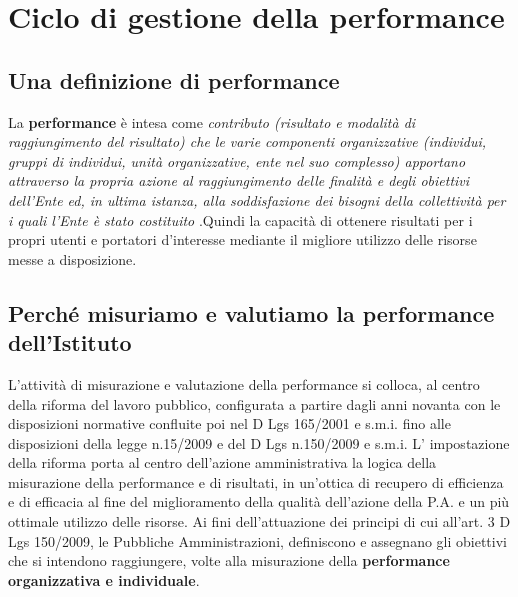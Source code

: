 \documentclass[
  12pt,
]{article}
\begin{document}
\hypertarget{ciclo-di-gestione-della-performance}{%
\section{Ciclo di gestione della
performance}\label{ciclo-di-gestione-della-performance}}

\hypertarget{una-definizione-di-performance}{%
\subsection{Una definizione di
performance}\label{una-definizione-di-performance}}

La \textbf{performance} è intesa come \emph{contributo (risultato e
modalità di raggiungimento del risultato) che le varie componenti
organizzative (individui, gruppi di individui, unità organizzative, ente
nel suo complesso) apportano attraverso la propria azione al
raggiungimento delle finalità e degli obiettivi dell'Ente ed, in ultima
istanza, alla soddisfazione dei bisogni della collettività per i quali
l'Ente è stato costituito} .Quindi la capacità di ottenere risultati per
i propri utenti e portatori d'interesse mediante il migliore utilizzo
delle risorse messe a disposizione.

\hypertarget{perchuxe9-misuriamo-e-valutiamo-la-performance-dellistituto}{%
\subsection{Perché misuriamo e valutiamo la performance
dell'Istituto}\label{perchuxe9-misuriamo-e-valutiamo-la-performance-dellistituto}}

L'attività di misurazione e valutazione della performance si colloca, al
centro della riforma del lavoro pubblico, configurata a partire dagli
anni novanta con le disposizioni normative confluite poi nel D Lgs
165/2001 e s.m.i. fino alle disposizioni della legge n.15/2009 e del D
Lgs n.150/2009 e s.m.i. L' impostazione della riforma porta al centro
dell'azione amministrativa la logica della misurazione della performance
e di risultati, in un'ottica di recupero di efficienza e di efficacia al
fine del miglioramento della qualità dell'azione della P.A. e un più
ottimale utilizzo delle risorse. Ai fini dell'attuazione dei principi di
cui all'art. 3 D Lgs 150/2009, le Pubbliche Amministrazioni, definiscono
e assegnano gli obiettivi che si intendono raggiungere, volte alla
misurazione della \textbf{performance organizzativa e individuale}.
\end{document}
